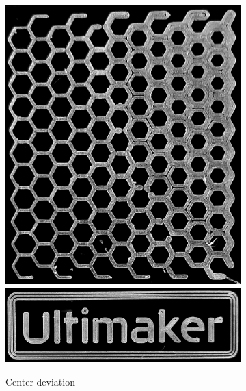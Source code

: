 \begin{figure}
\begin{subfigure}{\figwidth}
\includegraphics[height=\figheight]{sources/applications/P3_print_hex_center_edited.png}
\includegraphics[width=\figwidth]{sources/applications/P3_print_UM_center_edited.png}
\caption{Center deviation}\label{print_center}
\end{subfigure}
\begin{subfigure}{\figwidth}\centering

\end{subfigure}
\end{figure}
